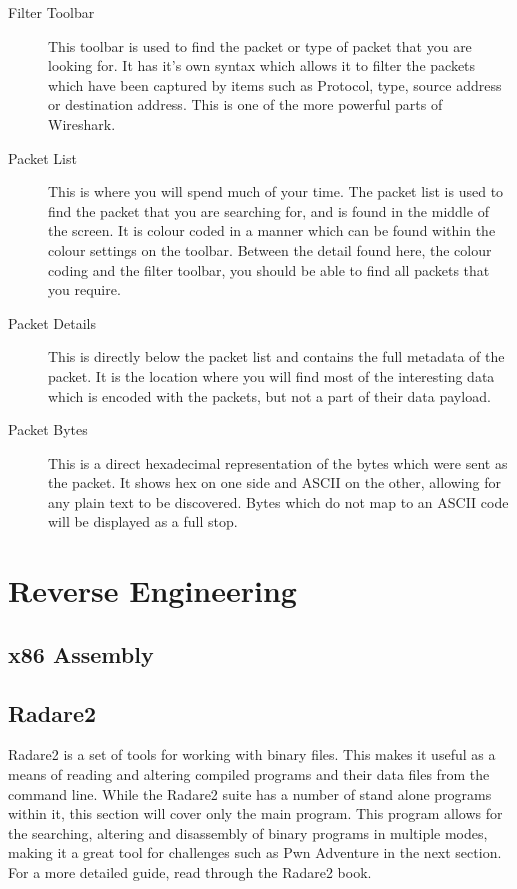 \documentclass[a4paper,11pt]{report}
\begin{document}
			\begin{description}
				\item[Filter Toolbar] This toolbar is used to find the packet or type of packet that you are looking for. 
					It has it's own syntax which allows it to filter the packets which have been captured by items such as
					Protocol, type, source address or destination address. 
					This is one of the more powerful parts of Wireshark. 
				\item[Packet List] This is where you will spend much of your time. 
					The packet list is used to find the packet that you are searching for, and is found in the middle of the screen. 
					It is colour coded in a manner which can be found within the colour settings on the toolbar. 
					Between the detail found here, the colour coding and the filter toolbar, you should be able to find all packets that you require. 
				\item[Packet Details]
					This is directly below the packet list and contains the full metadata of the packet. 
					It is the location where you will find most of the interesting data which is encoded with the packets, but not a part of their data payload. 
				\item[Packet Bytes]
					This is a direct hexadecimal representation of the bytes which were sent as the packet. 
					It shows hex on one side and ASCII on the other, allowing for any plain text to be discovered. 
					Bytes which do not map to an ASCII code will be displayed as a full stop. 
			\end{description}
			
\chapter{Reverse Engineering}
	\label{ch:ReverseEngineering}
	\section{x86 Assembly}
	\section{Radare2}
		Radare2 is a set of tools for working with binary files. 
		This makes it useful as a means of reading and altering compiled programs and their data files from the command line. 
		While the Radare2 suite has a number of stand alone programs within it, this section will cover only the main program. 
		This program allows for the searching, altering and disassembly of binary programs in multiple modes, making it a great tool for challenges such as Pwn Adventure in the next section.
		For a more detailed guide, read through the Radare2 book.\cite{Radare2}
\end{document}
